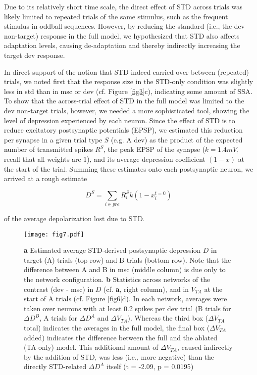 \documentclass[pdflatex,referee,iicol,sn-basic]{sn-jnl}
\theoremstyle{thmstyleone}%
\theoremstyle{thmstyletwo}%
\theoremstyle{thmstylethree}%
\begin{document}
Due to its relatively short time scale, the direct effect of STD across trials was likely limited to repeated trials of the same stimulus, such as the frequent stimulus in oddball sequences. However, by reducing the standard (i.e., the dev non-target) response in the full model, we hypothesized that STD also affects adaptation levels, causing de-adaptation and thereby indirectly increasing the target dev response.

In direct support of the notion that STD indeed carried over between (repeated) trials, we noted first that the response size in the STD-only condition was slightly less in std than in msc or dev (cf. Figure \ref{fig3}c), indicating some amount of SSA. To show that the across-trial effect of STD in the full model was limited to the dev non-target trials, however, we needed a more sophisticated tool, showing the level of depression experienced by each neuron. Since the effect of STD is to reduce excitatory postsynaptic potentials (EPSP), we estimated this reduction per synapse in a given trial type $S$ (e.g. A dev) as the product of the expected number of transmitted spikes $R^S$, the peak EPSP of the synapse ($k = 1.4 mV$, recall that all weights are 1), and its average depression coefficient $(1-x)$ at the start of the trial. Summing these estimates onto each postsynaptic neuron, we arrived at a rough estimate

\begin{equation}
    D^S = \sum_{i \in pre} R^S_i k (1-x_i^{t=0})
\end{equation}

of the average depolarization lost due to STD.

\begin{figure*}%
    \centering
    \texttt{[image: fig7.pdf]}
    \caption{\textbf{a} Estimated average STD-derived postsynaptic depression $D$ in target (A) trials (top row) and B trials (bottom row). Note that the difference between A and B in msc (middle column) is due only to the network configuration. \textbf{b} Statistics across networks of the contrast (dev - msc) in $D$ (cf. \textbf{a}, right column), and in $V_{TA}$ at the start of A trials (cf. Figure \ref{fig6}d). In each network, averages were taken over neurons with at least 0.2 spikes per dev trial (B trials for $\Delta D^B$, A trials for $\Delta D^A$ and $\Delta V_{TA}$). Whereas the third box ($\Delta V_{TA}$ total) indicates the averages in the full model, the final box ($\Delta V_{TA}$ added) indicates the difference between the full and the ablated (TA-only) model. This additional amount of $\Delta V_{TA}$, caused indirectly by the addition of STD, was less (i.e., more negative) than the directly STD-related $\Delta D^A$ itself (t = -2.09, p = 0.0195)}
    \label{fig7}
\end{figure*}
\end{document}
